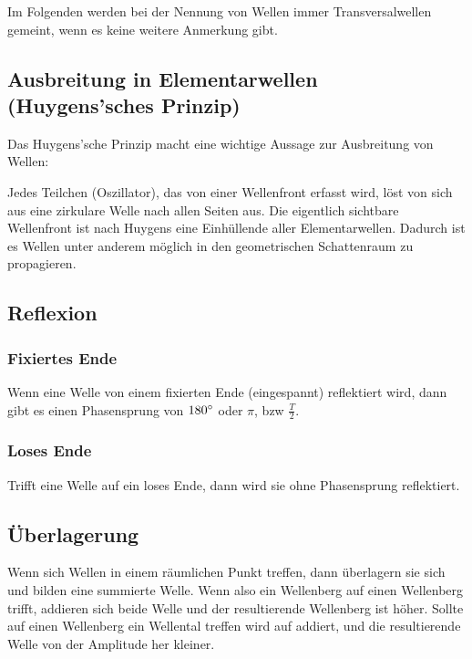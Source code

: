 Im Folgenden werden bei der Nennung von \glqq Wellen\grqq{} immer Transversalwellen gemeint, wenn es keine weitere Anmerkung gibt.  


\subsection[Ausbreitung in Elementarwellen]{Ausbreitung in Elementarwellen (Huygens'sches Prinzip)} \label{subsec:ausbreitung}

Das Huygens'sche Prinzip macht eine wichtige Aussage zur Ausbreitung von Wellen:

\glqq Jedes Teilchen (Oszillator), das von einer Wellenfront erfasst wird, löst von sich aus eine zirkulare Welle nach allen Seiten aus.\grqq{} Die eigentlich sichtbare Wellenfront ist nach Huygens eine Einhüllende aller \glqq Elementarwellen\grqq . Dadurch ist es Wellen unter anderem möglich in den geometrischen Schattenraum zu propagieren. 


\subsection{Reflexion}  
	\subsubsection{Fixiertes Ende}
	
	Wenn eine Welle von einem fixierten Ende (eingespannt) reflektiert wird, dann gibt es einen Phasensprung von $180 \degree$ oder $\pi$, bzw $\frac{T}{2}$.
	
	\subsubsection{Loses Ende}
	
	Trifft eine Welle auf ein loses Ende, dann wird sie ohne Phasensprung reflektiert.



\subsection{Überlagerung}

Wenn sich Wellen in einem räumlichen Punkt treffen, dann überlagern sie sich und bilden eine summierte Welle. Wenn also ein Wellenberg auf einen Wellenberg trifft, addieren sich beide Welle und der resultierende Wellenberg ist höher. Sollte auf einen Wellenberg ein Wellental treffen wird auf addiert, und die resultierende Welle von der Amplitude her kleiner.

